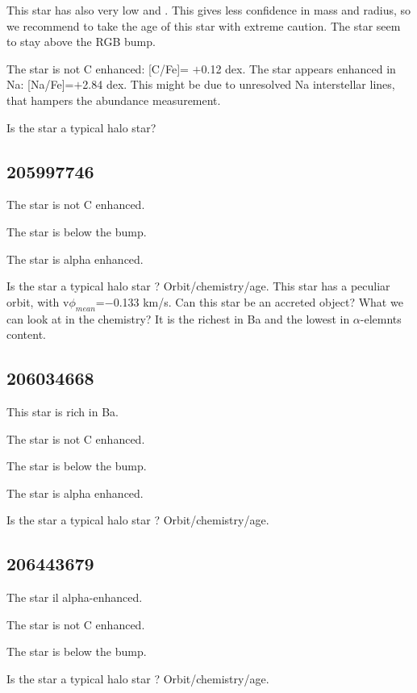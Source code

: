 \documentclass{aa}
\begin{document}
This star has also very low \Dnu and \numax. This gives less confidence in mass and radius, so we recommend to take the age of this star with extreme caution. The star seem to stay above the RGB  bump. 

The star is not C enhanced: [C/Fe]= $+$0.12 dex. The star appears enhanced in Na: [Na/Fe]=$+$2.84 dex. This might be due to unresolved Na interstellar lines, that hampers the abundance measurement.  

Is the star a typical halo star?

\subsection{205997746}
The star is not C enhanced.

The star is below the bump.

The star is alpha enhanced.

Is the star a typical halo star ? Orbit/chemistry/age. This star has a peculiar orbit, with v$\phi_{mean}$=$-$0.133 km/s. Can this star be an accreted object? What we can look at in the chemistry? It is the richest in Ba and the lowest in $\alpha$-elemnts content.

\subsection{206034668}
This star is rich in Ba.

The star is not C enhanced.

The star is below the bump.

The star is alpha enhanced.

Is the star a typical halo star ? Orbit/chemistry/age.

\subsection{206443679}

The star il alpha-enhanced.

The star is not C enhanced.

The star is below the bump.

Is the star a typical halo star ? Orbit/chemistry/age.
\end{document}
